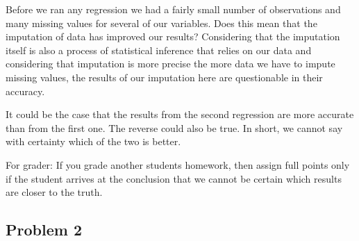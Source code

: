 \documentclass[12pt]{article}\usepackage[]{graphicx}\usepackage[]{color}
\begin{document}
Before we ran any regression we had a fairly small number of observations and many missing values for several of our variables. Does this mean that the imputation of data has improved our results? Considering that the imputation itself is also a process of statistical inference that relies on our data and considering that imputation is more precise the more data we have to impute missing values, the results of our imputation here are questionable in their accuracy.

It could be the case that the results from the second regression are more accurate than from the first one. The reverse could also be true. In short, we cannot say with certainty which of the two is better.

For grader: If you grade another students homework, then assign full points only if the student arrives at the conclusion that we cannot be certain which results are closer to the truth.



\subsection*{Problem 2}
\end{document}
